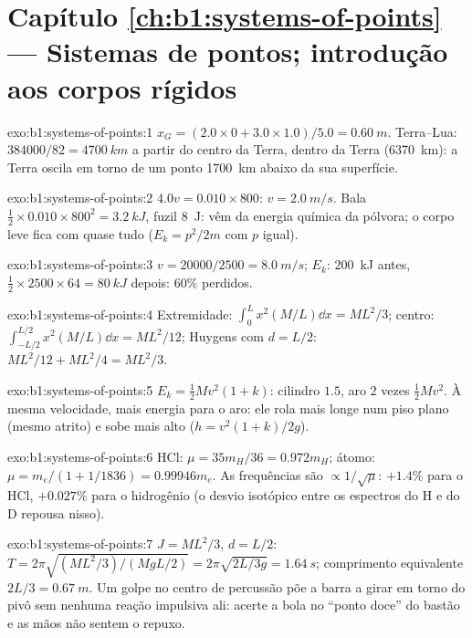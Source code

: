 \section*{Capítulo \ref{ch:b1:systems-of-points} --- Sistemas de pontos; introdução aos corpos rígidos}

\begin{solution}{exo:b1:systems-of-points:1}
$x_G = (2.0 \times 0 + 3.0 \times 1.0)/5.0 = \qty{0.60}{m}$. Terra--Lua:
$384000/82 = \qty{4700}{km}$ a partir do centro da Terra, dentro da Terra
(\qty{6370}{km}): a Terra oscila em torno de um ponto \qty{1700}{km} abaixo
da sua superfície.
\end{solution}

\begin{solution}{exo:b1:systems-of-points:2}
$4.0v = 0.010 \times 800$: $v = \qty{2.0}{m/s}$. Bala $\tfrac12 \times 0.010
\times 800^2 = \qty{3.2}{kJ}$, fuzil \qty{8}{J}: vêm da energia química da
pólvora; o corpo leve fica com quase tudo ($E_k = p^2/2m$
com $p$ igual).
\end{solution}

\begin{solution}{exo:b1:systems-of-points:3}
$v = 20000/2500 = \qty{8.0}{m/s}$; $E_k$: \qty{200}{kJ} antes, $\tfrac12 \times
2500 \times 64 = \qty{80}{kJ}$ depois: $60\%$ perdidos.
\end{solution}

\begin{solution}{exo:b1:systems-of-points:4}
Extremidade: $\int_0^L x^2(M/L)\dd x = ML^2/3$; centro: $\int_{-L/2}^{L/2}x^2(M/L)
\dd x = ML^2/12$; Huygens com $d = L/2$: $ML^2/12 + ML^2/4 = ML^2/3$.
\end{solution}

\begin{solution}{exo:b1:systems-of-points:5}
$E_k = \tfrac12 Mv^2(1 + k)$: cilindro $1.5$, aro $2$ vezes $\tfrac12 Mv^2$.
À mesma velocidade, mais energia para o aro: ele rola mais longe num piso plano
(mesmo atrito) e sobe mais alto ($h = v^2(1 + k)/2g$).
\end{solution}

\begin{solution}{exo:b1:systems-of-points:6}
HCl: $\mu = 35m_H/36 = 0.972m_H$; átomo: $\mu = m_e/(1 + 1/1836) =
0.99946m_e$. As frequências são $\propto 1/\sqrt\mu$: $+1.4\%$ para o HCl, $+0.027\%$
para o hidrogênio (o desvio isotópico entre os espectros do H e do D repousa nisso).
\end{solution}

\begin{solution}{exo:b1:systems-of-points:7}
$J = ML^2/3$, $d = L/2$: $T = 2\pi\sqrt{(ML^2/3)/(MgL/2)} = 2\pi\sqrt{2L/3g}
= \qty{1.64}{s}$; comprimento equivalente $2L/3 = \qty{0.67}{m}$. Um golpe no
centro de percussão põe a barra a girar em torno do pivô sem nenhuma reação
impulsiva ali: acerte a bola no ``ponto doce'' do bastão e as mãos não
sentem o repuxo.
\end{solution}


